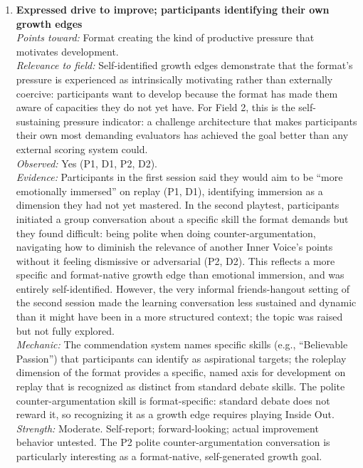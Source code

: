 \begin{enumerate}
\item \textbf{Expressed drive to improve; participants identifying their own growth edges}\\
\textit{Points toward:} Format creating the kind of productive pressure that motivates development.\\
\textit{Relevance to field:} Self-identified growth edges demonstrate that the format's pressure is experienced as intrinsically motivating rather than externally coercive: participants want to develop because the format has made them aware of capacities they do not yet have. For Field 2, this is the self-sustaining pressure indicator: a challenge architecture that makes participants their own most demanding evaluators has achieved the goal better than any external scoring system could.\\
\textit{Observed:} Yes (P1, D1, P2, D2).\\
\textit{Evidence:} Participants in the first session said they would aim to be ``more emotionally immersed'' on replay (P1, D1), identifying immersion as a dimension they had not yet mastered. In the second playtest, participants initiated a group conversation about a specific skill the format demands but they found difficult: being polite when doing counter-argumentation, navigating how to diminish the relevance of another Inner Voice's points without it feeling dismissive or adversarial (P2, D2). This reflects a more specific and format-native growth edge than emotional immersion, and was entirely self-identified. However, the very informal friends-hangout setting of the second session made the learning conversation less sustained and dynamic than it might have been in a more structured context; the topic was raised but not fully explored.\\
\textit{Mechanic:} The commendation system names specific skills (e.g., ``Believable Passion'') that participants can identify as aspirational targets; the roleplay dimension of the format provides a specific, named axis for development on replay that is recognized as distinct from standard debate skills. The polite counter-argumentation skill is format-specific: standard debate does not reward it, so recognizing it as a growth edge requires playing Inside Out.\\
\textit{Strength:} Moderate. Self-report; forward-looking; actual improvement behavior untested. The P2 polite counter-argumentation conversation is particularly interesting as a format-native, self-generated growth goal.

\end{enumerate}

